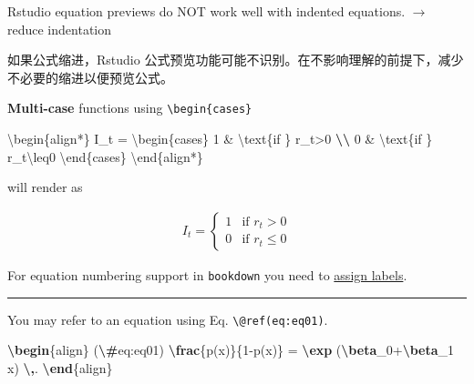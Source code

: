 \documentclass[
]{book}
\newenvironment{Shaded}{\begin{snugshade}}{\end{snugshade}}
\newcommand{\ExtensionTok}[1]{#1}
\newcommand{\KeywordTok}[1]{\textcolor[rgb]{0.13,0.29,0.53}{\textbf{#1}}}
\newcommand{\NormalTok}[1]{#1}
\newcommand{\SpecialCharTok}[1]{\textcolor[rgb]{0.81,0.36,0.00}{\textbf{#1}}}
\newcommand{\SpecialStringTok}[1]{\textcolor[rgb]{0.31,0.60,0.02}{#1}}
\theoremstyle{definition}
\theoremstyle{definition}
\theoremstyle{definition}
\theoremstyle{definition}
\theoremstyle{remark}
\begin{document}
Rstudio equation previews do NOT work well with indented equations. \(\rightarrow\) reduce indentation

如果公式缩进，Rstudio 公式预览功能可能不识别。在不影响理解的前提下，减少不必要的缩进以便预览公式。

\textbf{Multi-case} functions using \texttt{\textbackslash{}begin\{cases\}}

\begin{Shaded}
\begin{Highlighting}[]
\NormalTok{\textbackslash{}begin\{align*\}}
\NormalTok{I\_t = }
\NormalTok{\textbackslash{}begin\{cases\}}
\NormalTok{1 \& \textbackslash{}text\{if \} r\_t\textgreater{}0 }\SpecialCharTok{\textbackslash{}\textbackslash{}}
\NormalTok{0 \& \textbackslash{}text\{if \} r\_t\textbackslash{}leq0}
\NormalTok{\textbackslash{}end\{cases\}}
\NormalTok{\textbackslash{}end\{align*\}}
\end{Highlighting}
\end{Shaded}

will render as

\begin{align*}
I_t = 
\begin{cases}
1 & \text{if } r_t>0 \\
0 & \text{if } r_t\leq0
\end{cases}
\end{align*}

For equation numbering support in \texttt{bookdown} you need to \href{https://bookdown.org/yihui/bookdown/markdown-extensions-by-bookdown.html\#equations}{assign labels}.

\begin{center}\rule{0.5\linewidth}{0.5pt}\end{center}

You may refer to an equation using Eq. \texttt{\textbackslash{}@ref(eq:eq01)}.

\begin{Shaded}
\begin{Highlighting}[]
\KeywordTok{\textbackslash{}begin}\NormalTok{\{}\ExtensionTok{align}\NormalTok{\}}\SpecialStringTok{ (}\SpecialCharTok{\textbackslash{}\#}\SpecialStringTok{eq:eq01)}
\SpecialCharTok{\textbackslash{}frac}\SpecialStringTok{\{p(x)\}\{1{-}p(x)\} = }\SpecialCharTok{\textbackslash{}exp}\SpecialStringTok{ (}\SpecialCharTok{\textbackslash{}beta}\SpecialStringTok{\_0+}\SpecialCharTok{\textbackslash{}beta}\SpecialStringTok{\_1 x) }\SpecialCharTok{\textbackslash{},}\SpecialStringTok{.}
\KeywordTok{\textbackslash{}end}\NormalTok{\{}\ExtensionTok{align}\NormalTok{\}}
\end{Highlighting}
\end{Shaded}
\end{document}
